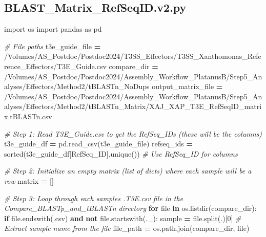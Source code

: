 \documentclass[
]{book}
\newenvironment{Shaded}{\begin{snugshade}}{\end{snugshade}}
\newcommand{\BuiltInTok}[1]{#1}
\newcommand{\CommentTok}[1]{\textcolor[rgb]{0.56,0.35,0.01}{\textit{#1}}}
\newcommand{\ControlFlowTok}[1]{\textcolor[rgb]{0.13,0.29,0.53}{\textbf{#1}}}
\newcommand{\DecValTok}[1]{\textcolor[rgb]{0.00,0.00,0.81}{#1}}
\newcommand{\ImportTok}[1]{#1}
\newcommand{\KeywordTok}[1]{\textcolor[rgb]{0.13,0.29,0.53}{\textbf{#1}}}
\newcommand{\NormalTok}[1]{#1}
\newcommand{\OperatorTok}[1]{\textcolor[rgb]{0.81,0.36,0.00}{\textbf{#1}}}
\newcommand{\StringTok}[1]{\textcolor[rgb]{0.31,0.60,0.02}{#1}}
\begin{document}
\subsection{BLAST\_Matrix\_RefSeqID.v2.py}\label{mxrs2-script}

\begin{Shaded}
\begin{Highlighting}[]
\ImportTok{import}\NormalTok{ os}
\ImportTok{import}\NormalTok{ pandas }\ImportTok{as}\NormalTok{ pd}

\CommentTok{\# File paths}
\NormalTok{t3e\_guide\_file }\OperatorTok{=} \StringTok{\textquotesingle{}/Volumes/AS\_Postdoc/Postdoc2024/T3SS\_Effectors/T3SS\_Xanthomonas\_Reference\_Effectors/T3E\_Guide.csv\textquotesingle{}}
\NormalTok{compare\_dir }\OperatorTok{=} \StringTok{\textquotesingle{}/Volumes/AS\_Postdoc/Postdoc2024/Assembly\_Workflow\_PlatanusB/Step5\_Analyses/Effectors/Method2/tBLASTn\_NoDups\textquotesingle{}}
\NormalTok{output\_matrix\_file }\OperatorTok{=} \StringTok{\textquotesingle{}/Volumes/AS\_Postdoc/Postdoc2024/Assembly\_Workflow\_PlatanusB/Step5\_Analyses/Effectors/Method2/tBLASTn\_Matrix/XAJ\_XAP\_T3E\_RefSeqID\_matrix.tBLASTn.csv\textquotesingle{}}

\CommentTok{\# Step 1: Read T3E\_Guide.csv to get the RefSeq\_IDs (these will be the columns)}
\NormalTok{t3e\_guide\_df }\OperatorTok{=}\NormalTok{ pd.read\_csv(t3e\_guide\_file)}
\NormalTok{refseq\_ids }\OperatorTok{=} \BuiltInTok{sorted}\NormalTok{(t3e\_guide\_df[}\StringTok{\textquotesingle{}RefSeq\_ID\textquotesingle{}}\NormalTok{].unique())  }\CommentTok{\# Use RefSeq\_ID for columns}

\CommentTok{\# Step 2: Initialize an empty matrix (list of dicts) where each sample will be a row}
\NormalTok{matrix }\OperatorTok{=}\NormalTok{ []}

\CommentTok{\# Step 3: Loop through each sample\textquotesingle{}s .T3E.csv file in the Compare\_BLASTp\_and\_tBLASTn directory}
\ControlFlowTok{for} \BuiltInTok{file} \KeywordTok{in}\NormalTok{ os.listdir(compare\_dir):}
    \ControlFlowTok{if} \BuiltInTok{file}\NormalTok{.endswith(}\StringTok{\textquotesingle{}.csv\textquotesingle{}}\NormalTok{) }\KeywordTok{and} \KeywordTok{not} \BuiltInTok{file}\NormalTok{.startswith(}\StringTok{\textquotesingle{}.\_\textquotesingle{}}\NormalTok{):}
\NormalTok{        sample }\OperatorTok{=} \BuiltInTok{file}\NormalTok{.split(}\StringTok{\textquotesingle{}.\textquotesingle{}}\NormalTok{)[}\DecValTok{0}\NormalTok{]  }\CommentTok{\# Extract sample name from the file}
\NormalTok{        file\_path }\OperatorTok{=}\NormalTok{ os.path.join(compare\_dir, }\BuiltInTok{file}\NormalTok{)}
        

\end{Highlighting}
\end{Shaded}
\end{document}
